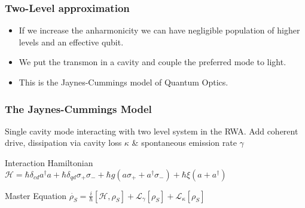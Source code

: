 \documentclass{beamer}
\begin{document}
\begin{frame}

    \frametitle{Two-Level approximation}

    \begin{itemize}
        \item If we increase the anharmonicity we can have negligible 
                population of higher levels and an effective qubit.
        \item We put the transmon in a cavity and couple 
                the preferred mode to light.
        \item This is the Jaynes-Cummings model of Quantum Optics. 
    \end{itemize}

\end{frame}
\begin{frame}

    \frametitle{The Jaynes-Cummings Model}

    \begin{center}
    \end{center}

    Single cavity mode interacting with two level system in the RWA.
    Add coherent drive, dissipation via cavity loss $\kappa$ \& 
    spontaneous emission rate $\gamma$

    \begin{block}{Interaction Hamiltonian}
        $
        \mathscr{H} = \hbar \delta_{cd} a^\dagger a + 
        \hbar \delta_{qd}\sigma_+ \sigma_- + 
        \hbar g ( a \sigma_+ + a^\dagger \sigma_- ) + 
        \hbar \xi (a + a^\dagger) 
        $
    \end{block}

    \begin{block}{Master Equation}
        $
        \dot{\rho_S} = \frac{i}{\hbar} [ \mathscr{H}, \rho_S ] +
        \mathscr{L}_{\gamma} [\rho_S] + \mathscr{L}_{\kappa}[ \rho_S ]
        $
    \end{block}

\end{frame}
\end{document}
